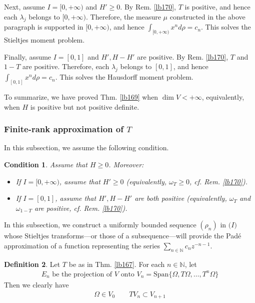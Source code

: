 \documentclass[12pt,b5paper,notitlepage]{article}
\theoremstyle{definition}
\newtheorem{df}{Definition}[section]
\theoremstyle{plain}
\newtheorem{cond}[df]{Condition}
\newcommand{\Span}{\mathrm{Span}}
\newcommand{\scr}{\mathscr}
\newcommand{\Nbb}{\mathbb N}
\numberwithin{equation}{section}
\begin{document}
Next, assume $I=[0,+\infty)$ and $H'\geq0$. By Rem. \ref{lb170}, $T$ is positive, and hence each $\lambda_j$ belongs to $[0,+\infty)$. Therefore, the measure $\mu$ constructed in the above paragraph is supported in $[0,+\infty)$, and hence $\int_{[0,+\infty)}x^nd\rho=c_n$. This solves the Stieltjes moment problem.

Finally, assume $I=[0,1]$ and $H',H-H'$ are positive. By Rem. \ref{lb170}, $T$ and $1-T$ are positive. Therefore, each $\lambda_j$ belongs to $[0,1]$, and hence $\int_{[0,1]}x^nd\rho=c_n$. This solves the Hausdorff moment problem.

To summarize, we have proved Thm. \ref{lb169} when $\dim V<+\infty$, equivalently, when $H$ is positive but not positive definite.





\subsubsection{Finite-rank approximation of $T$}


In this subsection, we assume the following condition.

\begin{cond}\label{lb178}
Assume that $H\geq0$. Moreover:
\begin{itemize}
\item If $I=[0,+\infty)$, assume that $H'\geq0$ (equivalently, $\omega_T\geq0$, cf. Rem. \ref{lb170}).
\item If $I=[0,1]$, assume that $H',H-H'$ are both positive (equivalently, $\omega_T$ and $\omega_{1-T}$ are positive, cf. Rem. \ref{lb170}). 
\end{itemize}
\end{cond}


In this subsection, we construct a uniformly bounded sequence $(\rho_n)$ in $\scr (I)$ whose Stieltjes transforms---or those of a subsequence---will provide the Pad\'e approximation of a function representing the series $\sum_{n\in\Nbb}c_nz^{-n-1}$.

\begin{df}\label{lb189}
Let $T$ be as in Thm. \ref{lb167}. For each $n\in\Nbb$, let
\begin{align*}
E_n\text{ be the projection of $V$ onto }V_n=\Span\{\Omega,T\Omega,\dots,T^n\Omega\}
\end{align*}
Then we clearly have
\begin{align}\label{eq84}
\Omega\in V_0\qquad TV_n\subset V_{n+1}
\end{align}
\end{df}
\end{document}
